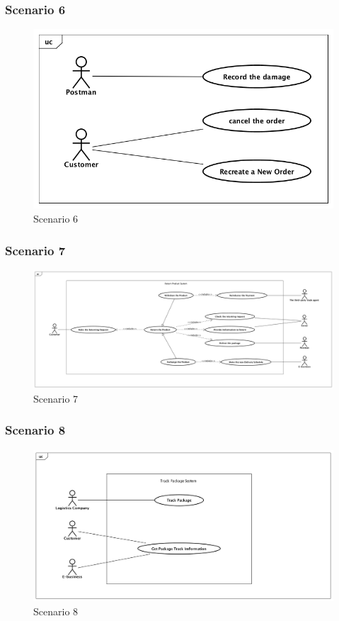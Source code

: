 \documentclass[12pt]{scrreprt}
\begin{document}
\subsubsection{Scenario 6}
\begin{figure}[htbp]
  \centering\includegraphics[width=6in]{DocumentRes/Scenario6.png}
  \caption{Scenario 6}
\end{figure}

\subsubsection{Scenario 7}
\begin{figure}[htbp]
  \centering\includegraphics[width=6in]{DocumentRes/Scenario7.png}
  \caption{Scenario 7}
\end{figure}

\subsubsection{Scenario 8}
\begin{figure}[htbp]
  \centering\includegraphics[width=6in]{DocumentRes/Scenario8.png}
  \caption{Scenario 8}
\end{figure}
\end{document}

